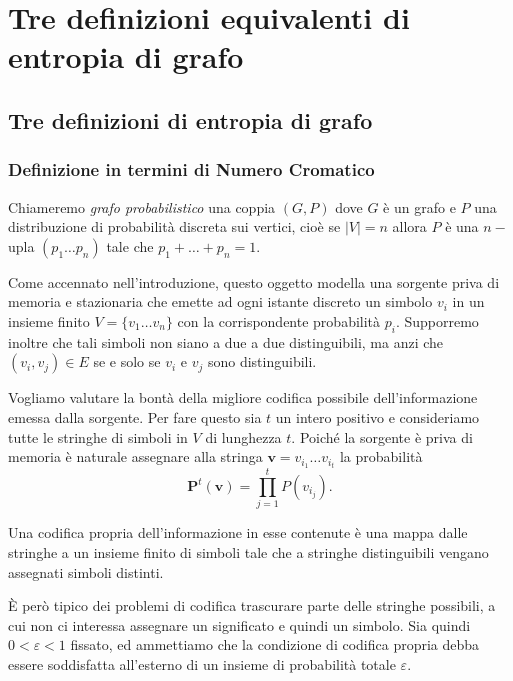 \chapter{Tre definizioni equivalenti di entropia di grafo}
\section{Tre definizioni di entropia di grafo}
\subsection{Definizione in termini di Numero Cromatico} \label{codinganalogy} 
\begin{definition}
	Chiameremo \emph{grafo probabilistico} una coppia \((G,P)\) dove \(G\) è un grafo e \(P\) una distribuzione di probabilità discreta sui vertici, cioè se \(|V|=n\) allora \(P\) è una \(n-\)upla \((p_1 \dots p_n)\) tale che \(p_1 + \dots + p_n = 1\). 
\end{definition}

Come accennato nell'introduzione, questo oggetto modella una sorgente priva di memoria e stazionaria che emette ad ogni istante discreto un simbolo \(v_i\) in un insieme finito \(V=\{v_1 \dots v_n\}\) con la corrispondente probabilità \(p_i\). Supporremo inoltre che tali simboli non siano a due a due distinguibili, ma anzi che \((v_i, v_j) \in E\) se e solo se \(v_i\) e \(v_j\) sono distinguibili.

Vogliamo valutare la bontà della migliore codifica possibile dell'informazione emessa dalla sorgente. Per fare questo sia \(t\) un intero positivo e consideriamo tutte le stringhe di simboli in \(V\) di lunghezza \(t\). Poiché la sorgente è priva di memoria è naturale assegnare alla stringa \(\mathbf{v} = v_{i_1}\dots v_{i_t}\) la probabilità 
\begin{equation}
	\label{eq:probability}\mathbf{P}^t(\mathbf{v})=\prod_{j=1}^t P(v_{i_j}). 
\end{equation}

Una codifica propria dell'informazione in esse contenute è una mappa dalle stringhe a un insieme finito di simboli tale che a stringhe distinguibili vengano assegnati simboli distinti.

È però tipico dei problemi di codifica trascurare parte delle stringhe possibili, a cui non ci interessa assegnare un significato e quindi un simbolo. Sia quindi \(0<\varepsilon <1\) fissato, ed ammettiamo che la condizione di codifica propria debba essere soddisfatta all'esterno di un insieme di probabilità totale \(\varepsilon\).

